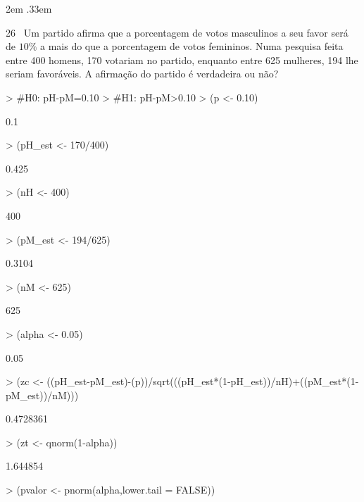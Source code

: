 \documentclass{article}
\newenvironment{ManualExercise}
  {\begin{list}{}{\leftmargin \QuestionIndent
    \partopsep0pt \parsep\parskip \topsep\QuestionBefore
    \itemsep\QuestionBefore \labelwidth2em
    \labelsep.33em
    \usecounter{Question}}}
  {\end{list}}
\begin{document}
\begin{Exercise}
\begin{ManualExercise}
\item[26~] Um partido afirma que a porcentagem de votos masculinos a seu favor será de $10\%$ a mais do que a porcentagem de votos femininos. Numa pesquisa feita entre 
400 homens, 170 votariam no partido, enquanto entre 625 mulheres, 194 lhe seriam favoráveis. A afirmação do partido é verdadeira ou não?

\begin{Schunk}
\begin{Sinput}
> #H0: pH-pM=0.10
> #H1: pH-pM>0.10
> (p <- 0.10)
\end{Sinput}
\begin{Soutput}
[1] 0.1
\end{Soutput}
\begin{Sinput}
> (pH_est <- 170/400)
\end{Sinput}
\begin{Soutput}
[1] 0.425
\end{Soutput}
\begin{Sinput}
> (nH <- 400)
\end{Sinput}
\begin{Soutput}
[1] 400
\end{Soutput}
\begin{Sinput}
> (pM_est <- 194/625)
\end{Sinput}
\begin{Soutput}
[1] 0.3104
\end{Soutput}
\begin{Sinput}
> (nM <- 625)
\end{Sinput}
\begin{Soutput}
[1] 625
\end{Soutput}
\begin{Sinput}
> (alpha <- 0.05)
\end{Sinput}
\begin{Soutput}
[1] 0.05
\end{Soutput}
\begin{Sinput}
> (zc <- ((pH_est-pM_est)-(p))/sqrt(((pH_est*(1-pH_est))/nH)+((pM_est*(1-pM_est))/nM)))
\end{Sinput}
\begin{Soutput}
[1] 0.4728361
\end{Soutput}
\begin{Sinput}
> (zt <- qnorm(1-alpha))
\end{Sinput}
\begin{Soutput}
[1] 1.644854
\end{Soutput}
\begin{Sinput}
> (pvalor <- pnorm(alpha,lower.tail = FALSE))

\end{Sinput}
\end{Schunk}
\end{ManualExercise}
\end{Exercise}
\end{document}
